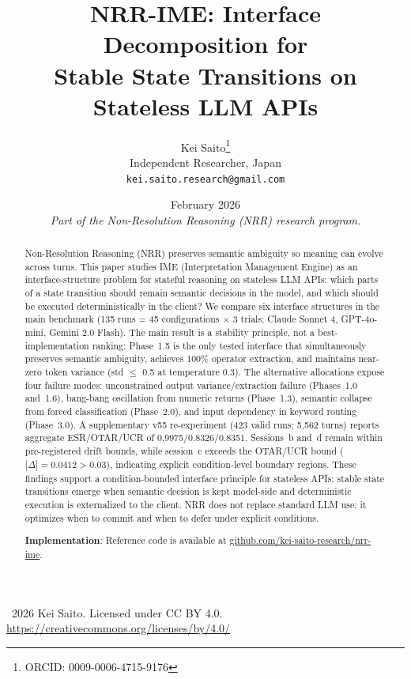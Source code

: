 \documentclass[11pt,a4paper]{article}
\title{\textbf{NRR-IME: Interface Decomposition for\\Stable State Transitions on Stateless LLM APIs}}
\author{
  Kei Saito\thanks{ORCID: 0009-0006-4715-9176} \\
  Independent Researcher, Japan \\
  \texttt{kei.saito.research@gmail.com}
}
\date{February 2026 \\[0.5em]
\textit{Part of the Non-Resolution Reasoning (NRR) research program.}}
\begin{document}
\maketitle

\begin{center}
\textcopyright\ 2026 Kei Saito.
Licensed under CC BY 4.0.\\
\url{https://creativecommons.org/licenses/by/4.0/}
\end{center}

\begin{abstract}
Non-Resolution Reasoning (NRR) preserves semantic ambiguity so meaning can evolve
across turns. This paper studies IME (Interpretation Management Engine) as an
interface-structure problem for stateful reasoning on stateless LLM APIs: which
parts of a state transition should remain semantic decisions in the model, and
which should be executed deterministically in the client? We compare six
interface structures in the main benchmark (135 runs = 45 configurations
$\times$ 3 trials; Claude Sonnet 4, GPT-4o-mini, Gemini 2.0 Flash). The main
result is a stability principle, not a best-implementation ranking: Phase~1.5
is the only tested interface that simultaneously preserves semantic ambiguity,
achieves 100\% operator extraction, and maintains near-zero token variance (std
$\leq$ 0.5 at temperature 0.3). The alternative allocations expose four
failure modes: unconstrained output variance/extraction failure (Phases~1.0
and~1.6), bang-bang oscillation from numeric returns (Phase~1.3), semantic
collapse from forced classification (Phase~2.0), and input dependency in keyword
routing (Phase~3.0). A supplementary v55 re-experiment (423 valid runs; 5{,}562
turns) reports aggregate ESR/OTAR/UCR of 0.9975/0.8326/0.8351. Sessions~b and~d
remain within pre-registered drift bounds, while session~c exceeds the OTAR/UCR
bound ($|\Delta|=0.0412 > 0.03$), indicating explicit condition-level boundary
regions. These findings support a condition-bounded interface principle for
stateless APIs: stable state transitions emerge when semantic decision is kept
model-side and deterministic execution is externalized to the client. NRR does
not replace standard LLM use; it optimizes when to commit and when to defer
under explicit conditions.

\textbf{Implementation}: Reference code is available at
\href{https://github.com/kei-saito-research/nrr-ime}{github.com/kei-saito-research/nrr-ime}.
\end{abstract}
\end{document}
